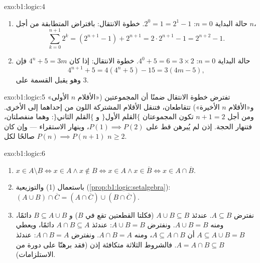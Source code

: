 \begin{solution}{exo:b1:logic:4}
\begin{enumerate}
  \item حالة البداية $n = 0$: $2^0 = 1 = 2^1 - 1$. خطوة الانتقال:
        بافتراض المتطابقة من أجل $n$،
        \[
        \sum_{k=0}^{n+1} 2^k = (2^{n+1} - 1) + 2^{n+1}
        = 2 \cdot 2^{n+1} - 1 = 2^{n+2} - 1 .
        \]
  \item حالة البداية $n = 0$: $4^0 + 5 = 6 = 3 \times 2$. خطوة الانتقال: إذا كان
        $4^n + 5 = 3m$ فإن
        \[
        4^{n+1} + 5 = 4(4^n + 5) - 15 = 3(4m - 5),
        \]
        وهو يقبل القسمة على $3$.
\end{enumerate}
\end{solution}

\begin{solution}{exo:b1:logic:5}
تفترض خطوة الانتقال ضمنًا أن المجموعتين («الأقلام $n$ الأولى»
و«الأقلام $n$ الأخيرة») تتقاطعان، فتنقل الأقلام المشتركة اللون من
إحداهما إلى الأخرى. ومن أجل $n + 1 = 2$ تكون المجموعتان
$\{$القلم الأول$\}$ و $\{$القلم الثاني$\}$: وهما منفصلتان،
فتنهار الحجة. إذن لم يُبرهن قط على $P(1) \implies P(2)$، وينهار
الاستقراء --- وإن كان $P(n) \implies P(n+1)$ صالحًا لكل
$n \geq 2$.
\end{solution}

\begin{solution}{exo:b1:logic:6}
\begin{enumerate}
  \item $x \in A \setminus B \iff x \in A \land x \notin B \iff x \in
        A \land x \in \overline{B} \iff x \in A \cap \overline{B}$.
  \item باستعمال (1) والتوزيعية
        (\cref{prop:b1:logic:setalgebra}):
        $(A \cup B) \cap \overline{C} = (A \cap \overline{C}) \cup
        (B \cap \overline{C})$.
  \item نفترض $A \subseteq B$. عندئذ $A \cup B \subseteq B$ (فكلتا
        القطعتين تقع في $B$) و $B \subseteq A \cup B$ دائمًا، ومنه
        $A \cup B = B$. ونفترض $A \cup B = B$: عندئذ $A \cap B
        \subseteq A$ دائمًا، ويعطي $A \subseteq A \cup B = B$ أن
        $A \subseteq A \cap B$، ومنه $A \cap B = A$. ونفترض $A \cap B =
        A$: عندئذ $A = A \cap B \subseteq B$. فالشروط الثلاثة
        متكافئة إذن (فقد برهنّا على دورة من الاستلزامات).
\end{enumerate}
\end{solution}


